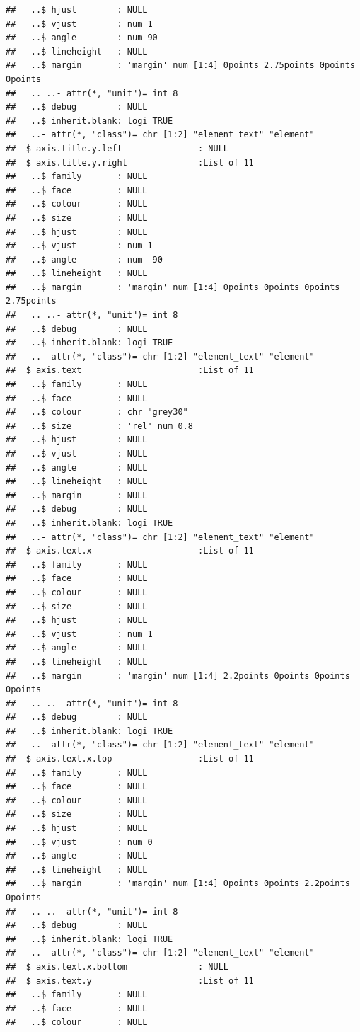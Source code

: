 \documentclass[
  12pt,
]{article}
\begin{document}
\begin{verbatim}
##   ..$ hjust        : NULL
##   ..$ vjust        : num 1
##   ..$ angle        : num 90
##   ..$ lineheight   : NULL
##   ..$ margin       : 'margin' num [1:4] 0points 2.75points 0points 0points
##   .. ..- attr(*, "unit")= int 8
##   ..$ debug        : NULL
##   ..$ inherit.blank: logi TRUE
##   ..- attr(*, "class")= chr [1:2] "element_text" "element"
##  $ axis.title.y.left               : NULL
##  $ axis.title.y.right              :List of 11
##   ..$ family       : NULL
##   ..$ face         : NULL
##   ..$ colour       : NULL
##   ..$ size         : NULL
##   ..$ hjust        : NULL
##   ..$ vjust        : num 1
##   ..$ angle        : num -90
##   ..$ lineheight   : NULL
##   ..$ margin       : 'margin' num [1:4] 0points 0points 0points 2.75points
##   .. ..- attr(*, "unit")= int 8
##   ..$ debug        : NULL
##   ..$ inherit.blank: logi TRUE
##   ..- attr(*, "class")= chr [1:2] "element_text" "element"
##  $ axis.text                       :List of 11
##   ..$ family       : NULL
##   ..$ face         : NULL
##   ..$ colour       : chr "grey30"
##   ..$ size         : 'rel' num 0.8
##   ..$ hjust        : NULL
##   ..$ vjust        : NULL
##   ..$ angle        : NULL
##   ..$ lineheight   : NULL
##   ..$ margin       : NULL
##   ..$ debug        : NULL
##   ..$ inherit.blank: logi TRUE
##   ..- attr(*, "class")= chr [1:2] "element_text" "element"
##  $ axis.text.x                     :List of 11
##   ..$ family       : NULL
##   ..$ face         : NULL
##   ..$ colour       : NULL
##   ..$ size         : NULL
##   ..$ hjust        : NULL
##   ..$ vjust        : num 1
##   ..$ angle        : NULL
##   ..$ lineheight   : NULL
##   ..$ margin       : 'margin' num [1:4] 2.2points 0points 0points 0points
##   .. ..- attr(*, "unit")= int 8
##   ..$ debug        : NULL
##   ..$ inherit.blank: logi TRUE
##   ..- attr(*, "class")= chr [1:2] "element_text" "element"
##  $ axis.text.x.top                 :List of 11
##   ..$ family       : NULL
##   ..$ face         : NULL
##   ..$ colour       : NULL
##   ..$ size         : NULL
##   ..$ hjust        : NULL
##   ..$ vjust        : num 0
##   ..$ angle        : NULL
##   ..$ lineheight   : NULL
##   ..$ margin       : 'margin' num [1:4] 0points 0points 2.2points 0points
##   .. ..- attr(*, "unit")= int 8
##   ..$ debug        : NULL
##   ..$ inherit.blank: logi TRUE
##   ..- attr(*, "class")= chr [1:2] "element_text" "element"
##  $ axis.text.x.bottom              : NULL
##  $ axis.text.y                     :List of 11
##   ..$ family       : NULL
##   ..$ face         : NULL
##   ..$ colour       : NULL

\end{verbatim}
\end{document}
